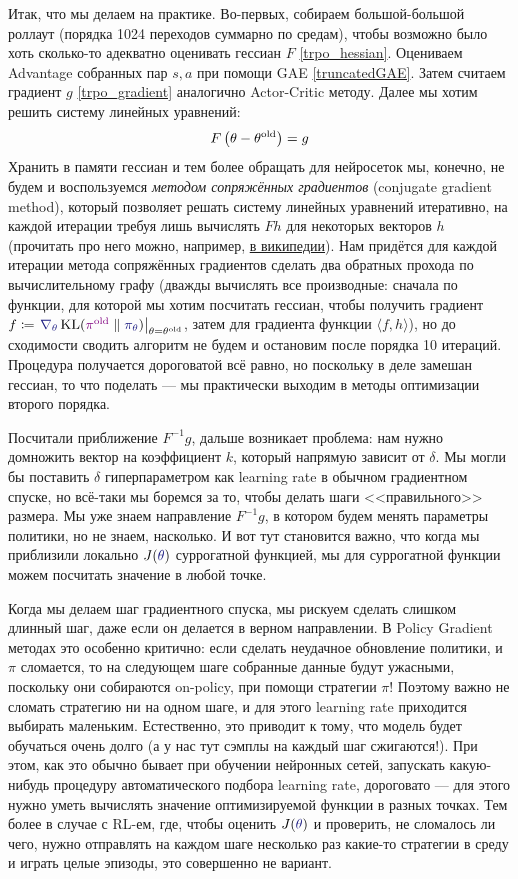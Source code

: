 Итак, что мы делаем на практике. Во-первых, собираем большой-большой роллаут (порядка 1024 переходов суммарно по средам), чтобы возможно было хоть сколько-то адекватно оценивать гессиан $F$ \eqref{trpo_hessian}. Оцениваем Advantage собранных пар $s, a$ при помощи GAE \eqref{truncatedGAE}. Затем считаем градиент $g$ \eqref{trpo_gradient} аналогично Actor-Critic методу. Далее мы хотим решить систему линейных уравнений:
$$F \left(\theta - \theta^{\mathrm{old}}\right) = g$$
Хранить в памяти гессиан и тем более обращать для нейросеток мы, конечно, не будем и воспользуемся \emph{методом сопряжённых градиентов} (conjugate gradient method), который позволяет решать систему линейных уравнений итеративно, на каждой итерации требуя лишь вычислять $Fh$ для некоторых векторов $h$ (прочитать про него можно, например, \href{https://ru.wikipedia.org/wiki/Метод_сопряжённых_градиентов_(для_решения_СЛАУ)}{в википедии}). Нам придётся для каждой итерации метода сопряжённых градиентов сделать два обратных прохода по вычислительному графу (дважды вычислять все производные: сначала по функции, для которой мы хотим посчитать гессиан, чтобы получить градиент $f \HM \coloneqq \left. \textcolor{ChadBlue}{\nabla_\theta} \KL(\textcolor{ChadPurple}{\pi^{\old}} \parallel \textcolor{ChadBlue}{\pi_\theta}) \right|_{\theta = \theta^{\old}}$, затем для градиента функции $\langle f, h \rangle$), но до сходимости сводить алгоритм не будем и остановим после порядка 10 итераций. Процедура получается дороговатой всё равно, но поскольку в деле замешан гессиан, то что поделать --- мы практически выходим в методы оптимизации второго порядка.

Посчитали приближение $F^{-1}g$, дальше возникает проблема: нам нужно домножить вектор на коэффициент $k$, который напрямую зависит от $\delta$. Мы могли бы поставить $\delta$ гиперпараметром как learning rate в обычном градиентном спуске, но всё-таки мы боремся за то, чтобы делать шаги <<правильного>> размера. Мы уже знаем направление $F^{-1}g$, в котором будем менять параметры политики, но не знаем, насколько. И вот тут становится важно, что когда мы приблизили локально $J(\textcolor{ChadBlue}{\theta})$ суррогатной функцией, мы для суррогатной функции можем посчитать значение в любой точке.

Когда мы делаем шаг градиентного спуска, мы рискуем сделать слишком длинный шаг, даже если он делается в верном направлении. В Policy Gradient методах это особенно критично: если сделать неудачное обновление политики, и $\pi$ сломается, то на следующем шаге собранные данные будут ужасными, поскольку они собираются on-policy, при помощи стратегии $\pi$! Поэтому важно не сломать стратегию ни на одном шаге, и для этого learning rate приходится выбирать маленьким. Естественно, это приводит к тому, что модель будет обучаться очень долго (а у нас тут сэмплы на каждый шаг сжигаются!). При этом, как это обычно бывает при обучении нейронных сетей, запускать какую-нибудь процедуру автоматического подбора learning rate, дороговато --- для этого нужно уметь вычислять значение оптимизируемой функции в разных точках. Тем более в случае с RL-ем, где, чтобы оценить $J(\textcolor{ChadBlue}{\theta})$ и проверить, не сломалось ли чего, нужно отправлять на каждом шаге несколько раз какие-то стратегии в среду и играть целые эпизоды, это совершенно не вариант.

